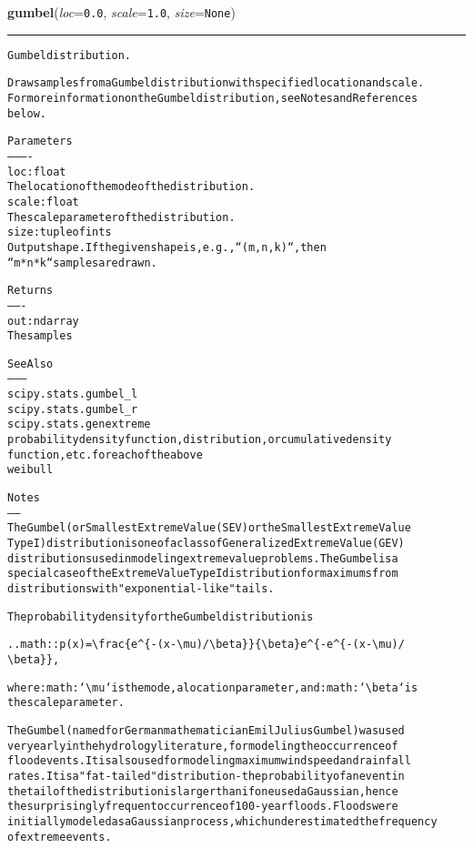 \hspace{.8\funcindent}\begin{boxedminipage}{\funcwidth}

    \raggedright \textbf{gumbel}(\textit{loc}={\tt 0.0}, \textit{scale}={\tt 1.0}, \textit{size}={\tt None})

    \vspace{-1.5ex}

    \rule{\textwidth}{0.5\fboxrule}
\setlength{\parskip}{2ex}
\begin{alltt}
Gumbel distribution.

Draw samples from a Gumbel distribution with specified location and scale.
For more information on the Gumbel distribution, see Notes and References
below.

Parameters
----------
loc : float
    The location of the mode of the distribution.
scale : float
    The scale parameter of the distribution.
size : tuple of ints
    Output shape.  If the given shape is, e.g., ``(m, n, k)``, then
    ``m * n * k`` samples are drawn.

Returns
-------
out : ndarray
    The samples

See Also
--------
scipy.stats.gumbel\_l
scipy.stats.gumbel\_r
scipy.stats.genextreme
    probability density function, distribution, or cumulative density
    function, etc. for each of the above
weibull

Notes
-----
The Gumbel (or Smallest Extreme Value (SEV) or the Smallest Extreme Value
Type I) distribution is one of a class of Generalized Extreme Value (GEV)
distributions used in modeling extreme value problems.  The Gumbel is a
special case of the Extreme Value Type I distribution for maximums from
distributions with "exponential-like" tails.

The probability density for the Gumbel distribution is

.. math:: p(x) = {\textbackslash}frac\{e{\textasciicircum}\{-(x - {\textbackslash}mu)/ {\textbackslash}beta\}\}\{{\textbackslash}beta\} e{\textasciicircum}\{ -e{\textasciicircum}\{-(x - {\textbackslash}mu)/
          {\textbackslash}beta\}\},

where :math:`{\textbackslash}mu` is the mode, a location parameter, and :math:`{\textbackslash}beta` is
the scale parameter.

The Gumbel (named for German mathematician Emil Julius Gumbel) was used
very early in the hydrology literature, for modeling the occurrence of
flood events. It is also used for modeling maximum wind speed and rainfall
rates.  It is a "fat-tailed" distribution - the probability of an event in
the tail of the distribution is larger than if one used a Gaussian, hence
the surprisingly frequent occurrence of 100-year floods. Floods were
initially modeled as a Gaussian process, which underestimated the frequency
of extreme events.



\end{alltt}
\end{boxedminipage}
